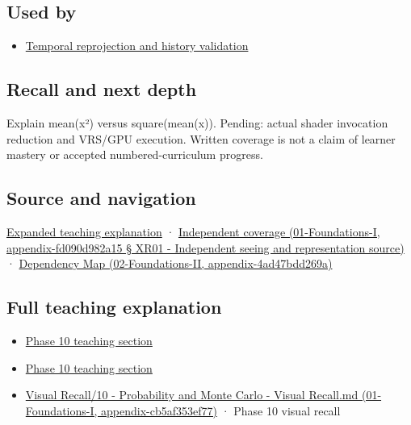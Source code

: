 \subsection{Used by}\label{used-by}

\begin{itemize}
\tightlist
\item
  \hyperref[appendix-0727340a4428]{Temporal reprojection and history validation}
\end{itemize}

\subsection{Recall and next depth}\label{recall-and-next-depth}

Explain mean(x²) versus square(mean(x)). Pending: actual shader invocation reduction and VRS/GPU execution. Written coverage is not a claim of learner mastery or accepted numbered-curriculum progress.

\subsection{Source and navigation}\label{source-and-navigation}

\href{Continuous\%20Notes/University\%20-\%20Worlds,\%20Images\%20and\%20Inference\%20-\%20Graphics,\%20Vision\%20and\%20Photography\#Multiresolution\%20work\%20must\%20preserve\%20the\%20right\%20information}{Expanded teaching explanation} · \href{}{Independent coverage (01-Foundations-I, appendix-fd090d982a15 § XR01 - Independent seeing and representation source)} · \href{}{Dependency Map (02-Foundations-II, appendix-4ad47bdd269a)}

\subsection{Full teaching explanation}\label{full-teaching-explanation}

\begin{itemize}
\tightlist
\item
  \href{Continuous\%20Notes/Computing\%20Foundations\%20-\%20From\%20Bits\%20to\%20C++\%20and\%20Systems\%20APIs\#6.\%20A\%20computer\%20produces\%20deterministic\%20pseudorandom\%20sequences}{Phase 10 teaching section}
\item
  \href{Continuous\%20Notes/Computing\%20Foundations\%20-\%20From\%20Bits\%20to\%20C++\%20and\%20Systems\%20APIs\#12.\%20Use\%20probability\%20to\%20evaluate\%20graphics\%20and\%20research\%20claims}{Phase 10 teaching section}
\item
  \href{}{Visual Recall/10 - Probability and Monte Carlo - Visual Recall.md (01-Foundations-I, appendix-cb5af353ef77)} · Phase 10 visual recall
\end{itemize}
